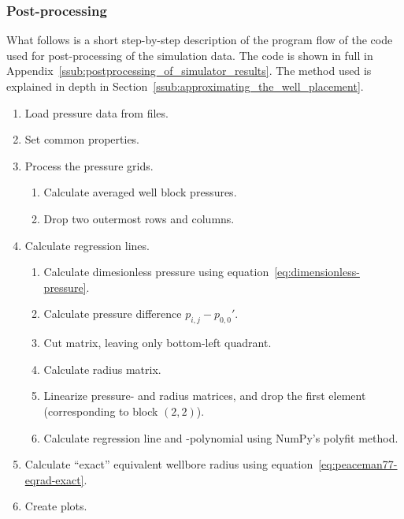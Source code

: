 \subsubsection{Post-processing} %
\label{ssub:post_processing}
What follows is a short step-by-step description of the program flow of the code used for post-processing of the simulation data. The code is shown in full in Appendix~\ref{ssub:postprocessing_of_simulator_results}. The method used is explained in depth in Section~\ref{ssub:approximating_the_well_placement}.

\begin{enumerate}
    \item Load pressure data from files.
    \item Set common properties.
    \item Process the pressure grids.
    \begin{enumerate}
        \item Calculate averaged well block pressures.
        \item Drop two outermost rows and columns.
    \end{enumerate}
    \item Calculate regression lines.
    \begin{enumerate}
        \item Calculate dimesionless pressure using equation~\eqref{eq:dimensionless-pressure}.
        \item Calculate pressure difference $p_{i,j}-p_{0,0}'$.
        \item Cut matrix, leaving only bottom-left quadrant.
        \item Calculate radius matrix.
        \item Linearize pressure- and radius matrices, and drop the first element (corresponding to block $(2,2)$).
        \item Calculate regression line and -polynomial using NumPy's polyfit method.
    \end{enumerate}
    \item Calculate ``exact'' equivalent wellbore radius using equation~\eqref{eq:peaceman77-eqrad-exact}.
    \item Create plots.
\end{enumerate}


